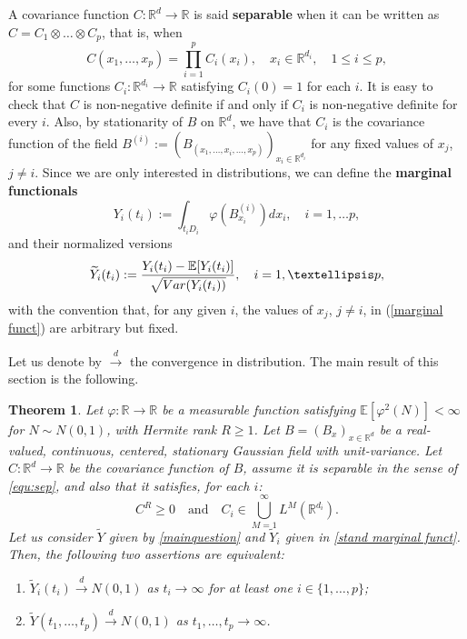 \documentclass[12pt]{article}
\DeclareMathOperator{\1}{1}
\newcommand{\R}{\mathbb{R}}
\newcommand{\E}{\mathbb{E}}
\newcommand{\f}{\varphi}
\theoremstyle{plain}
\newtheorem{theorem}{Theorem}
\theoremstyle{definition}
\begin{document}
A covariance function $C:\R^d\to\R$ is said \textbf{separable} when it can be written as $C=C_1\otimes\ldots\otimes C_p$, that is, when
\begin{equation}
    \label{equ:sep}
    C(x_1,\ldots,x_p)= \prod_{i=1}^p C_i(x_i),\quad x_i\in \R^{d_i},\quad 1\leq i\leq p,
\end{equation}
for some functions $C_i:\R^{d_i}\to\R$ satisfying $C_i(0)=1$ for each $i$.  
It is easy to check that $C$ is non-negative definite if and only if $C_i$ is non-negative definite for every $i$. Also, by stationarity of $B$ on $\R^d$, we have that $C_i$ is the covariance function of the field $B^{(i)}:=(B_{(x_1,\ldots,x_i,\ldots,x_p)})_{x_i\in\R^{d_i}}$ for any fixed values of $x_j$, $j\neq i$. Since we are only interested in distributions, we can define the \textbf{marginal functionals} 
\begin{equation} \label{marginal funct}   
Y_i(t_i):=\int_{t_iD_i}\varphi(B_{x_i}^{(i)})dx_i, \quad i=1,\ldots p,
\end{equation}
and their normalized versions
\begin{equation}\label{stand marginal funct}
    \widetilde{Y}_i(t_i):=\frac{Y_i(t_i)-\E[Y_i(t_i)]}{\sqrt{{\rm Var}(Y_i(t_i))}},\quad i=1,\ldots p,
\end{equation}
with the convention that, for any given $i$, the values of $x_j$, $j\neq i$, in (\ref{marginal funct}) are arbitrary but fixed.

Let us denote by $\overset{d}{\rightarrow}$ the convergence in distribution. The main result of this section is the following. 
\begin{theorem}\label{thm:main}
Let $\f:\R \rightarrow \R$ be a measurable function satisfying $\E[\varphi^2(N)]<\infty$ for $N\sim N(0,1)$, with Hermite rank $R\geq 1$. 
    Let $B=(B_x)_{x\in\R^d}$ be a real-valued, continuous, centered, stationary Gaussian field with unit-variance. 
    Let $C:\R^d \rightarrow \R$ be the covariance function of $B$, assume it is separable in the sense of \eqref{equ:sep}, and also that it satisfies, for each $i$:
$$
C^R\ge0\quad\mbox{and}\quad C_i\in \bigcup_{M=1}^\infty L^M(\R^{d_i}).
$$
   Let us consider $\widetilde Y$ given by \eqref{mainquestion} and $\widetilde Y_i$ given in \eqref{stand marginal funct}. 
    Then, the following two assertions are equivalent:
    \begin{enumerate}
        \item[(a)]
        $\widetilde{Y}_{i}(t_i)\overset{d}{\rightarrow} N(0,1)$ as $t_i \to \infty$ for at least one $i\in\{1,\ldots,p\}$;   
        \item[(b)]
        $\widetilde{Y}(t_1,\ldots,t_p)\overset{d}{\rightarrow} N(0,1)$ as $t_1,\ldots,t_p \to \infty$.
        \end{enumerate}
    
\end{theorem} 
\end{document}
